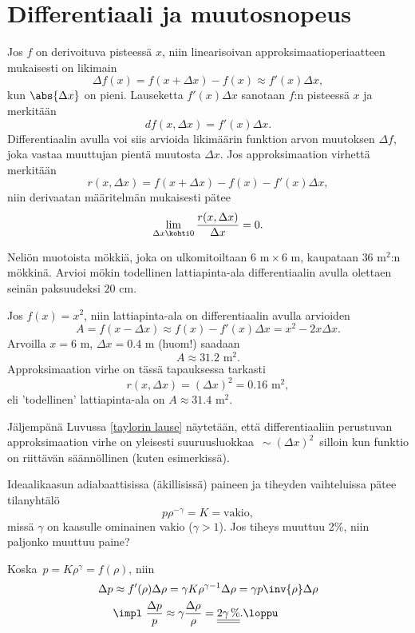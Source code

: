 \section{Differentiaali ja muutosnopeus} \label{differentiaali}
\alku

Jos $f$ on derivoituva pisteessä $x$, niin linearisoivan approksimaatioperiaatteen mukaisesti
on likimain
\[
\Delta f(x)=f(x+\Delta x)-f(x)\approx f'(x)\Delta x,
\]
kun $\abs{\Delta x}$ on pieni. Lauseketta $f'(x)\Delta x$ sanotaan $f$:n
%
 pisteessä $x$ ja merkitään
\[
df(x,\Delta x) = f'(x)\Delta x.
\]
Differentiaalin avulla voi siis arvioida likimäärin funktion arvon muutoksen $\Delta f$, joka
vastaa muuttujan pientä muutosta $\Delta x$. Jos approksimaation virhettä merkitään
\[
r(x,\Delta x) = f(x+\Delta x)-f(x)-f'(x)\Delta x,
\]
niin derivaatan määritelmän mukaisesti pätee
\[
\lim_{\Delta x \kohti 0} \frac{r(x,\Delta x)}{\Delta x} = 0.
\]
\begin{Exa}
Neliön muotoista mökkiä, joka on ulkomitoiltaan $6\text{ m}\times 6\text{ m}$, kaupataan 
$36\text{ m}^2$:n mökkinä. Arvioi mökin todellinen lattiapinta-ala differentiaalin avulla
olettaen seinän paksuudeksi $20\text{ cm}$.
\end{Exa}
\ratk Jos $f(x)=x^2$, niin lattiapinta-ala on differentiaalin avulla arvioiden
\[
A=f(x-\Delta x) \approx f(x)-f'(x)\Delta x = x^2-2x\Delta x.
\]
Arvoilla $x=6\text{ m}$, $\Delta x=0.4\text{ m}$ (huom!) saadaan
\[
A\approx 31.2\text{ m}^2.
\]
Approksimaation virhe on tässä tapauksessa tarkasti
\[
r(x,\Delta x) = (\Delta x)^2 = 0.16\text{ m}^2,
\]
eli 'todellinen' lattiapinta-ala on $A\approx 31.4\text{ m}^2$. \loppu

Jäljempänä Luvussa \ref{taylorin lause} näytetään, että differentiaaliin perustuvan
approksimaation virhe on yleisesti suuruusluokkaa $\,\sim (\Delta x)^2\,$ silloin kun
funktio on riittävän säännöllinen (kuten esimerkissä).
\begin{Exa}
Ideaalikaasun adiabaattisissa (äkillisissä) paineen ja tiheyden vaihteluissa pätee tilanyhtälö
\[
p\rho^{-\gamma}=K=\text{vakio},
\]
missä $\gamma$ on kaasulle ominainen vakio ($\gamma>1$). Jos tiheys muuttuu 2\%, niin paljonko
muuttuu paine?
\end{Exa}
\ratk Koska $\,p=K\rho^\gamma=f(\rho)$, niin
\begin{align*}
\Delta p &\approx f'(\rho)\Delta\rho =\gamma K\rho^{\gamma-1}\Delta\rho 
                                    =\gamma p\inv{\rho}\Delta\rho \\
         &\impl \ \frac{\Delta p}{p} \approx \gamma\frac{\Delta\rho}{\rho}
                                     =\underline{\underline{2\gamma\,\%}}. \loppu
\end{align*}


